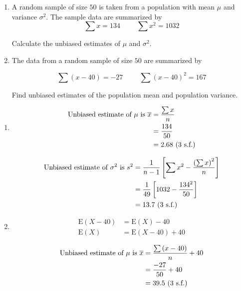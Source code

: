 \documentclass[11pt,a4paper]{book}
\begin{document}
\begin{example}

\begin{enumerate}[label=(\alph*)] 

\item A random sample of size $50$ is taken from a population with
mean $\mu$ and variance $\sigma^{2}$. The sample data are summarized
by
\[
\sum x=134\hspace{1cm}\sum x^{2}=1032
\]

Calculate the unbiased estimates of $\mu$ and $\sigma^{2}$.

\item  The data from a random sample of size $50$ are summarized
by

\[
\sum\left(x-40\right)=-27\hspace{1cm}\sum\left(x-40\right)^{2}=167
\]

Find unbiased estimates of the population mean and population variance.

\end{enumerate}

\Solution

\begin{enumerate}[label=(\alph*)] 

\item 
\begin{align*}
\text{Unbiased estimate of \ensuremath{\mu} is }\overline{x} & =\frac{\sum x}{n}\\
 & =\frac{134}{50}\\
 & =2.68\text{ (3 s.f.)}
\end{align*}

\begin{align*}
\text{Unbiased estimate of \ensuremath{\sigma^{2}} is }s^{2} & =\frac{1}{n-1}\left[\sum x^{2}-\frac{\left(\sum x\right)^{2}}{n}\right]\\
 & =\frac{1}{49}\left[1032-\frac{134^{2}}{50}\right]\\
 & =13.7\text{ (3 s.f.)}
\end{align*}

\item  
\begin{align*}
\text{E}\left(X-40\right) & =\text{E}\left(X\right)-40\\
\text{E}\left(X\right) & =\text{E}\left(X-40\right)+40
\end{align*}

\begin{align*}
\text{Unbiased estimate of \ensuremath{\mu} is }\overline{x} & =\frac{\sum\left(x-40\right)}{n}+40\\
 & =\frac{-27}{50}+40\\
 & =39.5\text{ (3 s.f.)}
\end{align*}


\end{enumerate}
\end{example}
\end{document}

